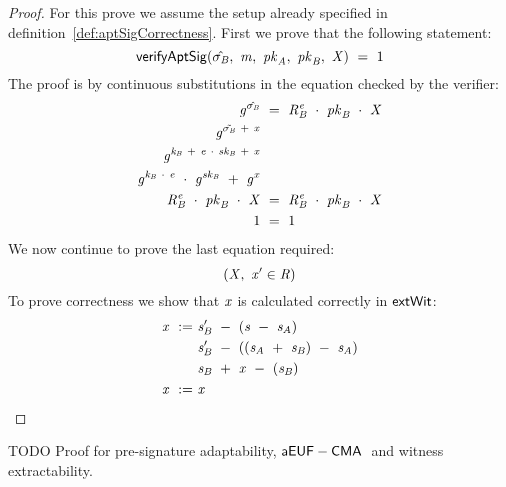 \begin{proof}
    \label{prf:aptSchnorrPreSigCorr}
    For this prove we assume the setup already specified in definition~\ref{def:aptSigCorrectness}.
    First we prove that the following statement:
    \[
        \mathsf{verifyAptSig}(\hat{\sigma_{\mathit{B}}} ,~ \mathit{m} ,~ \mathit{pk}_{\mathit{A}} ,~ \mathit{pk}_{\mathit{B}} ,~ \mathit{X}) ~=~ 1
    \]
    The proof is by continuous substitutions in the equation checked by the verifier:
    \begin{align}
        \mathit{g}^{\hat{\sigma_{\mathit{B}}}} &~=~ \mathit{R}_{\mathit{B}}^{\mathit{e}} ~\cdot~ \mathit{pk}_{\mathit{B}} ~\cdot~ \mathit{X} \\
        \mathit{g}^{\tilde{\sigma_{\mathit{B}}} ~+~ \mathit{x}} & \\
        \mathit{g}^{\mathit{\mathit{k}_{\mathit{B}}} ~+~ \mathit{e} ~\cdot~ \mathit{sk}_{\mathit{B}} ~+~ \mathit{x}} & \\
        \mathit{g}^{\mathit{\mathit{k}_{\mathit{B}}} ~\cdot~ \mathit{e}} ~\cdot~ \mathit{g}^{\mathit{sk}_{\mathit{B}}} ~+~ \mathit{g}^{\mathit{x}} & \\
        \mathit{R}_{\mathit{B}}^{\mathit{e}} ~\cdot~ \mathit{pk}_{\mathit{B}} ~\cdot~ \mathit{X} &~=~ \mathit{R}_{\mathit{B}}^{\mathit{e}} ~\cdot~ \mathit{pk}_{\mathit{B}} ~\cdot~ \mathit{X} \\
        1 &~=~ 1
    \end{align}
    We now continue to prove the last equation required:
    \[
        (\mathit{X} ,~ \mathit{x}' \in \mathit{R})
    \]
    To prove correctness we show that $\mathit{x}$ is calculated correctly in $\mathsf{extWit}$:
    \begin{align}
        \mathit{x} ~:=~ & \mathit{s}_{\mathit{B}}' ~-~ (\mathit{s} ~-~ \mathit{s}_{\mathit{A}}) \\
        & \mathit{s}_{\mathit{B}}' ~-~ ((\mathit{s}_{\mathit{A}} ~+~ \mathit{s}_{\mathit{B}} ) ~-~ \mathit{s}_{\mathit{A}} ) \\
        & \mathit{s}_{\mathit{B}} ~+~ \mathit{x} ~-~ (\mathit{s}_{\mathit{B}}) \\
        \mathit{x} ~:=~ & \mathit{x} \\
    \end{align}
\end{proof}

TODO Proof for pre-signature adaptability, $\mathsf{aEUF-CMA\;}$ and witness extractability.